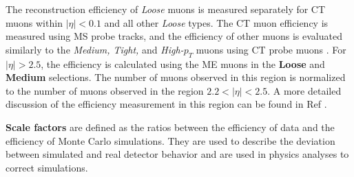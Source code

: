 The reconstruction efficiency of \textit{Loose} muons is measured separately for CT muons within $|\eta| < 0.1$ and all other \textit{Loose} types. The CT muon efficiency is measured using MS probe tracks, and the efficiency of other muons is evaluated similarly to the \textit{Medium, Tight,} and \textit{High-$p_T$} muons using CT probe muons \cite{MCPpaper}. For $|\eta| > 2.5$, the efficiency is calculated using the ME muons in the \textbf{Loose} and \textbf{Medium} selections. The number of muons observed in this region is normalized to the number of muons observed in the region $2.2 < |\eta| < 2.5$. A more detailed discussion of the efficiency measurement in this region can be found in Ref \cite{oldMCPpaper}. 

\textbf{Scale factors} are defined as the ratios between the efficiency of data and the efficiency of Monte Carlo simulations. They are used to describe the deviation between simulated and real detector behavior and are used in physics analyses to correct simulations. 
